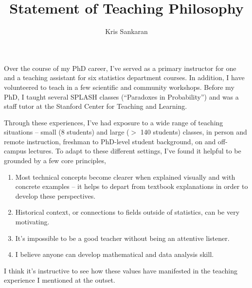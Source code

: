 \documentclass{article}
\title{Statement of Teaching Philosophy}
\author{Kris Sankaran}
\begin{document}
\maketitle

Over the course of my PhD career, I've served as a primary instructor for one
and a teaching assistant for six statistics department courses. In addition, I
have volunteered to teach in a few scientific and community workshops. Before my
PhD, I taught several SPLASH classes (``Paradoxes in Probability'') and was a
staff tutor at the Stanford Center for Teaching and Learning.

Through these experiences, I've had exposure to a wide range of teaching
situations -- small (8 students) and large ($>$ 140 students) classes, in person
and remote instruction, freshman to PhD-level student background, on and
off-campus lectures. To adapt to these different settings, I've found it helpful
to be grounded by a few core principles,
\begin{enumerate}
  \item Most technical concepts become clearer when explained visually and with
    concrete examples -- it helps to depart from textbook explanations in
    order to develop these perspectives.
  \item Historical context, or connections to fields outside of statistics, can
    be very motivating.
  \item It's impossible to be a good teacher without being an attentive
    listener.
  \item I believe anyone can develop mathematical and data analysis skill.
\end{enumerate}

I think it's instructive to see how these values have manifested in the teaching
experience I mentioned at the outset.
\end{document}
